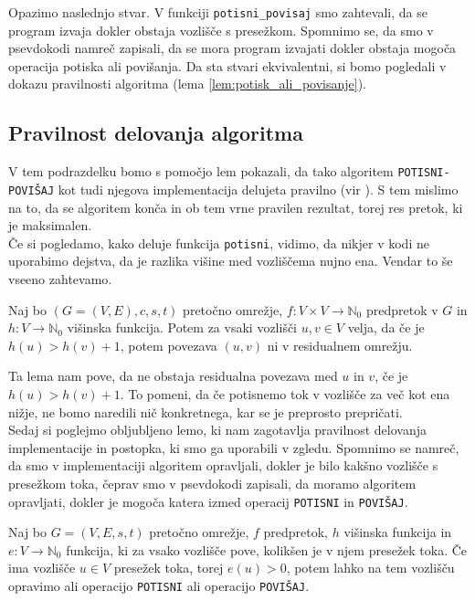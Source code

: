 \documentclass[mat1]{fmfdelo}
\newcommand{\N}{\mathbb N}
\begin{document}
Opazimo naslednjo stvar. V funkciji \texttt{potisni\_povisaj} smo zahtevali, da se program izvaja dokler obstaja vozlišče s presežkom. Spomnimo se, da smo v psevdokodi namreč zapisali, da se mora program izvajati dokler obstaja mogoča operacija potiska ali povišanja. Da sta stvari ekvivalentni, si bomo pogledali v dokazu pravilnosti algoritma (lema \ref{lem:potisk_ali_povisanje}).



\subsection{Pravilnost delovanja algoritma}

V tem podrazdelku bomo s pomočjo lem pokazali, da tako algoritem \texttt{POTISNI-POVIŠAJ} kot tudi njegova implementacija delujeta pravilno (vir \cite{clrs}). S tem mislimo na to, da se algoritem konča in ob tem vrne pravilen rezultat, torej res pretok, ki je maksimalen.\\

Če si pogledamo, kako deluje funkcija \texttt{potisni}, vidimo, da nikjer v kodi ne uporabimo dejstva, da je razlika višine med vozliščema nujno ena. Vendar to še vseeno zahtevamo.

\begin{lema}
Naj bo $(G = (V,E), c, s, t)$ pretočno omrežje, $f\colon V \times V \rightarrow \N_0$ predpretok v $G$ in $h\colon V \rightarrow \N_0$ višinska funkcija. Potem za vsaki vozlišči $u,v \in V$ velja, da če je $h(u) > h(v) + 1$, potem povezava $(u,v)$ ni v residualnem omrežju.
\end{lema}

Ta lema nam pove, da ne obstaja residualna povezava med $u$ in $v$, če je $h(u) > h(v) + 1$. To pomeni, da če potisnemo tok v vozlišče za več kot ena nižje, ne bomo naredili nič konkretnega, kar se je preprosto prepričati.\\


Sedaj si poglejmo obljubljeno lemo, ki nam zagotavlja pravilnost delovanja implementacije in postopka, ki smo ga uporabili v zgledu. Spomnimo se namreč, da smo v implementaciji algoritem opravljali, dokler je bilo kakšno vozlišče s presežkom toka, čeprav smo v psevdokodi zapisali, da moramo algoritem opravljati, dokler je mogoča katera izmed operacij \texttt{POTISNI} in \texttt{POVIŠAJ}.

\begin{lema}\label{lem:potisk_ali_povisanje}
Naj bo $G=(V,E,s,t)$ pretočno omrežje, $f$ predpretok, $h$ višinska funkcija in $e\colon V \rightarrow \N_0$ funkcija, ki za vsako vozlišče pove, kolikšen je v njem presežek toka. Če ima vozlišče $u\in V$ presežek toka, torej $e(u) > 0$, potem lahko na tem vozlišču opravimo ali operacijo \texttt{POTISNI} ali operacijo \texttt{POVIŠAJ}.
\end{lema}
\end{document}
